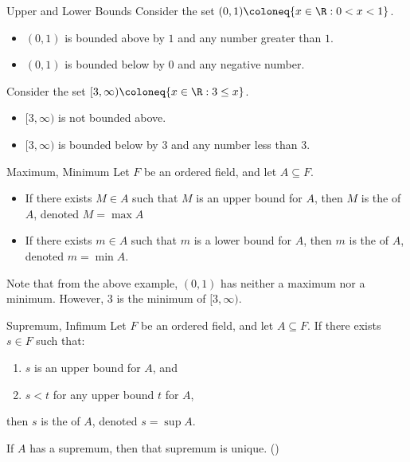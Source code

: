 \begin{exbox}{Upper and Lower Bounds}{}
    Consider the set $ (0,1) \coloneq \{ x \in \R : 0<x<1\}$.
    \begin{itemize}[noitemsep]
        \item $(0,1)$ is bounded above by $1$ and any number greater than $1$.
        \item $(0,1)$ is bounded below by $0$ and any negative number.
    \end{itemize}
    Consider the set $[3, \infty) \coloneq \{ x \in \R : 3 \leq x \}$.
    \begin{itemize}[noitemsep]
        \item $[3, \infty)$ is not bounded above.
        \item $[3, \infty)$ is bounded below by $3$ and any number less than $3$.
    \end{itemize}
\end{exbox}

\begin{dfnbox}{Maximum, Minimum}{}
    Let $F$ be an ordered field, and let $A \subseteq F$.
    \begin{itemize}[noitemsep]
        \item If there exists $M \in A$ such that $M$ is an upper bound for $A$, then $M$ is the  of $A$, denoted $M = \max A$
        \item If there exists $m \in A$ such that $m$ is a lower bound for $A$, then $m$ is the  of $A$, denoted $m = \min A$.
    \end{itemize}
\end{dfnbox}

Note that from the above example, $(0,1)$ has neither a maximum nor a minimum. However, 3 is the minimum of $[3,\infty)$.

\begin{dfnbox}{Supremum, Infimum}{}
    Let $F$ be an ordered field, and let $A \subseteq F$. If there exists $s \in F$ such that:
    \begin{enumerate}
        \item $s$ is an upper bound for $A$, and
        \item $s < t$ for any upper bound $t$ for $A$,
    \end{enumerate}
    then $s$ is the  of $A$, denoted $s = \sup A$.
\end{dfnbox}

If $A$ has a supremum, then that supremum is unique. ()

